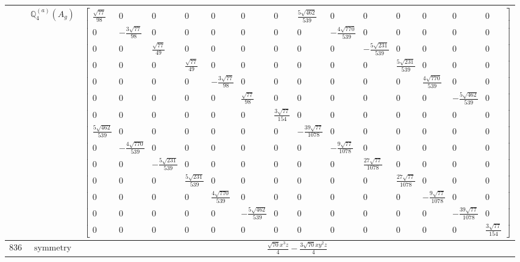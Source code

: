 \documentclass[fleqn,8pt,landscape]{jsarticle}
\begin{document}
\begin{longtable}{ccc}
$  $ & $ \mathbb{Q}_{4}^{(a)}(A_{g}) $ & $ \begin{bmatrix} \frac{\sqrt{77}}{98} & 0 & 0 & 0 & 0 & 0 & 0 & \frac{5 \sqrt{462}}{539} & 0 & 0 & 0 & 0 & 0 & 0 \\ 0 & - \frac{3 \sqrt{77}}{98} & 0 & 0 & 0 & 0 & 0 & 0 & - \frac{4 \sqrt{770}}{539} & 0 & 0 & 0 & 0 & 0 \\ 0 & 0 & \frac{\sqrt{77}}{49} & 0 & 0 & 0 & 0 & 0 & 0 & - \frac{5 \sqrt{231}}{539} & 0 & 0 & 0 & 0 \\ 0 & 0 & 0 & \frac{\sqrt{77}}{49} & 0 & 0 & 0 & 0 & 0 & 0 & \frac{5 \sqrt{231}}{539} & 0 & 0 & 0 \\ 0 & 0 & 0 & 0 & - \frac{3 \sqrt{77}}{98} & 0 & 0 & 0 & 0 & 0 & 0 & \frac{4 \sqrt{770}}{539} & 0 & 0 \\ 0 & 0 & 0 & 0 & 0 & \frac{\sqrt{77}}{98} & 0 & 0 & 0 & 0 & 0 & 0 & - \frac{5 \sqrt{462}}{539} & 0 \\ 0 & 0 & 0 & 0 & 0 & 0 & \frac{3 \sqrt{77}}{154} & 0 & 0 & 0 & 0 & 0 & 0 & 0 \\ \frac{5 \sqrt{462}}{539} & 0 & 0 & 0 & 0 & 0 & 0 & - \frac{39 \sqrt{77}}{1078} & 0 & 0 & 0 & 0 & 0 & 0 \\ 0 & - \frac{4 \sqrt{770}}{539} & 0 & 0 & 0 & 0 & 0 & 0 & - \frac{9 \sqrt{77}}{1078} & 0 & 0 & 0 & 0 & 0 \\ 0 & 0 & - \frac{5 \sqrt{231}}{539} & 0 & 0 & 0 & 0 & 0 & 0 & \frac{27 \sqrt{77}}{1078} & 0 & 0 & 0 & 0 \\ 0 & 0 & 0 & \frac{5 \sqrt{231}}{539} & 0 & 0 & 0 & 0 & 0 & 0 & \frac{27 \sqrt{77}}{1078} & 0 & 0 & 0 \\ 0 & 0 & 0 & 0 & \frac{4 \sqrt{770}}{539} & 0 & 0 & 0 & 0 & 0 & 0 & - \frac{9 \sqrt{77}}{1078} & 0 & 0 \\ 0 & 0 & 0 & 0 & 0 & - \frac{5 \sqrt{462}}{539} & 0 & 0 & 0 & 0 & 0 & 0 & - \frac{39 \sqrt{77}}{1078} & 0 \\ 0 & 0 & 0 & 0 & 0 & 0 & 0 & 0 & 0 & 0 & 0 & 0 & 0 & \frac{3 \sqrt{77}}{154} \end{bmatrix} $ \\ \hline
$ 836 $ & $ \text{symmetry} $ & $ \frac{\sqrt{70} x^{3} z}{4} - \frac{3 \sqrt{70} x y^{2} z}{4} $ \\

\end{longtable}
\end{document}
